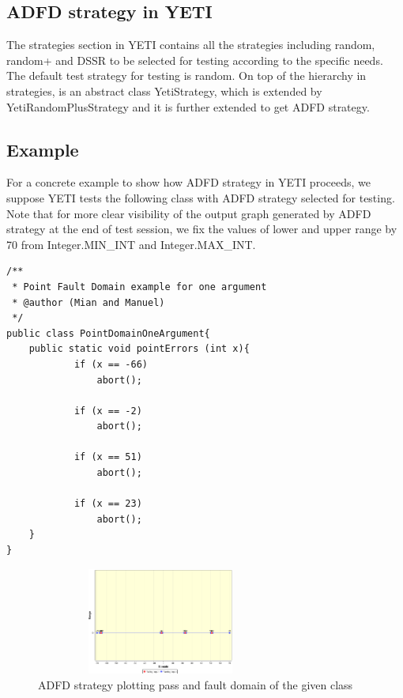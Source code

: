  \subsection{ADFD strategy in YETI}
The strategies section in YETI contains all the strategies including random, random+ and DSSR to be selected for testing according to the specific needs. The default test strategy for testing is random. On top of the hierarchy in strategies, is an abstract class YetiStrategy, which is extended by YetiRandomPlusStrategy and it is further extended to get ADFD strategy.
 

\subsection{Example}\label{sec:example}
For a concrete example to show how ADFD strategy in YETI proceeds, we suppose YETI tests the following class with ADFD strategy selected for testing. Note that for more clear visibility of the output graph generated by ADFD strategy at the end of test session, we fix the values of lower and upper range by 70 from Integer.MIN\_INT and Integer.MAX\_INT. 

\begin{lstlisting}
/**
 * Point Fault Domain example for one argument
 * @author (Mian and Manuel)
 */
public class PointDomainOneArgument{
	public static void pointErrors (int x){
     		if (x == -66)
       			abort();
     
     		if (x == -2)
     			abort();
      				
     		if (x == 51)
     			abort();
     
     		if (x == 23)
     			abort();
	}
}
\end{lstlisting}


\begin{figure}[H]
\centering
\includegraphics[width=8.2cm,height=3.5cm]{chapter4/pointDomainOneArgument.png}
\caption{ADFD strategy plotting pass and fault domain of the given class}
\label{fig:ADFD-example}
\end{figure}

